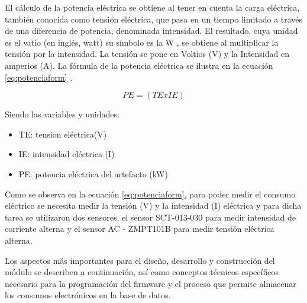 \vspace{0.1cm}

El cálculo de la potencia eléctrica se obtiene al tener en cuenta la carga eléctrica, también conocida como tensión eléctrica, que pasa en un tiempo limitado a través de una diferencia de potencia, denominada intensidad. El resultado, cuya unidad es el vatio (en inglés, watt) su símbolo es la W , se obtiene al multiplicar la tensión por la intensidad. La tensión se pone en Voltios (V) y la Intensidad en amperios (A). La fórmula de la potencia eléctrica se ilustra en la ecuación \ref{eq:potenciaform} \citep{WEBSITE:20}.

\begin{equation}
	\label{eq:potenciaform}
	PE = \left( TE x IE \right)
\end{equation}

\vspace{0.2cm}
Siendo las variables y unidades:
\begin{itemize}
\item TE: tension eléctrica(V)
\item IE: intensidad eléctrica (I)
\item PE: potencia eléctrica del artefacto (kW)
\end{itemize}


Como se observa en la ecuación \ref{eq:potenciaform}, para poder medir el consumo eléctrico se necesita medir la tensión (V) y la intensidad (I) eléctrica y para dicha tarea se utilizaron dos sensores, el sensor SCT-013-030 para medir intensidad de corriente alterna y el sensor AC - ZMPT101B para medir tensión eléctrica alterna.

Los aspectos más importantes para el diseño, desarrollo y construcción del módulo se describen  a continuación, así como conceptos técnicos específicos necesario para la programación del firmware y el proceso que permite almacenar los consumos electrónicos en la base de datos.


